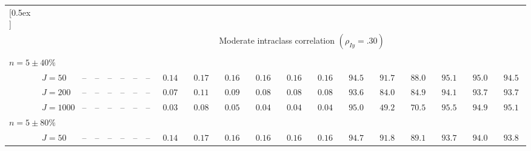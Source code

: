 \begin{sidewaystable}
\begin{threeparttable}
\begin{tabular}{llcccccccccccccccccc}
[0.5ex]\hline\\[-1.6ex] 
& & \multicolumn{18}{c}{Moderate intraclass correlation $(\rho_{Iy}=.30)$} \\[0.6ex]\hline\\[-1.8ex]
\multicolumn{4}{l}{$n=5\pm40\%$ } \\  & \nopagebreak $\;J=50$  & \phantom{00}--\phantom{00} & \phantom{00}--\phantom{00} & \phantom{00}--\phantom{00} & \phantom{00}--\phantom{00} & \phantom{00}--\phantom{00} & \phantom{00}--\phantom{00} & $\phantom{0}0.14\phantom{0}$ & $\phantom{0}0.17\phantom{0}$ & $\phantom{0}0.16\phantom{0}$ & $\phantom{0}0.16\phantom{0}$ & $\phantom{0}0.16\phantom{0}$ & $\phantom{0}0.16\phantom{0}$ & $\phantom{0}94.5\phantom{0}$ & $\phantom{0}91.7\phantom{0}$ & $\phantom{0}88.0\phantom{0}$ & $\phantom{0}95.1\phantom{0}$ & $\phantom{0}95.0\phantom{0}$ & $\phantom{0}94.5\phantom{0}$ \\
 & \nopagebreak $\;J=200$  & \phantom{00}--\phantom{00} & \phantom{00}--\phantom{00} & \phantom{00}--\phantom{00} & \phantom{00}--\phantom{00} & \phantom{00}--\phantom{00} & \phantom{00}--\phantom{00} & $\phantom{0}0.07\phantom{0}$ & $\phantom{0}0.11\phantom{0}$ & $\phantom{0}0.09\phantom{0}$ & $\phantom{0}0.08\phantom{0}$ & $\phantom{0}0.08\phantom{0}$ & $\phantom{0}0.08\phantom{0}$ & $\phantom{0}93.6\phantom{0}$ & $\phantom{0}84.0\phantom{0}$ & $\phantom{0}84.9\phantom{0}$ & $\phantom{0}94.1\phantom{0}$ & $\phantom{0}93.7\phantom{0}$ & $\phantom{0}93.7\phantom{0}$ \\
 & \nopagebreak $\;J=1000$  & \phantom{00}--\phantom{00} & \phantom{00}--\phantom{00} & \phantom{00}--\phantom{00} & \phantom{00}--\phantom{00} & \phantom{00}--\phantom{00} & \phantom{00}--\phantom{00} & $\phantom{0}0.03\phantom{0}$ & $\phantom{0}0.08\phantom{0}$ & $\phantom{0}0.05\phantom{0}$ & $\phantom{0}0.04\phantom{0}$ & $\phantom{0}0.04\phantom{0}$ & $\phantom{0}0.04\phantom{0}$ & $\phantom{0}95.0\phantom{0}$ & $\phantom{0}49.2\phantom{0}$ & $\phantom{0}70.5\phantom{0}$ & $\phantom{0}95.5\phantom{0}$ & $\phantom{0}94.9\phantom{0}$ & $\phantom{0}95.1\phantom{0}$ \\
\multicolumn{4}{l}{$n=5\pm80\%$ } \\  & \nopagebreak $\;J=50$  & \phantom{00}--\phantom{00} & \phantom{00}--\phantom{00} & \phantom{00}--\phantom{00} & \phantom{00}--\phantom{00} & \phantom{00}--\phantom{00} & \phantom{00}--\phantom{00} & $\phantom{0}0.14\phantom{0}$ & $\phantom{0}0.17\phantom{0}$ & $\phantom{0}0.16\phantom{0}$ & $\phantom{0}0.16\phantom{0}$ & $\phantom{0}0.16\phantom{0}$ & $\phantom{0}0.16\phantom{0}$ & $\phantom{0}94.7\phantom{0}$ & $\phantom{0}91.8\phantom{0}$ & $\phantom{0}89.1\phantom{0}$ & $\phantom{0}93.7\phantom{0}$ & $\phantom{0}94.0\phantom{0}$ & $\phantom{0}93.8\phantom{0}$ \\

\end{tabular}
\end{threeparttable}
\end{sidewaystable}
